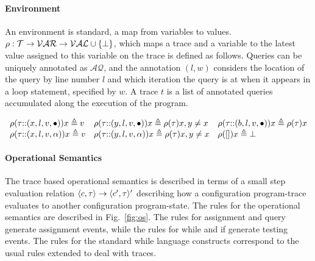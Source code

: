 \paragraph{Environment}
An environment is standard, a map from variables to values.
$\rho : {\mathcal{T}}  \to \mathcal{VAR} \to \mathcal{VAL} \cup \{\bot\}$, 
which maps a trace and a variable to the latest value assigned to this variable on the trace is defined as follows.
Queries can be uniquely annotated as $\mathcal{AQ}$, and the annotation $(l,w)$ considers the location of the query by line number $l$ and which 
iteration the query is at when it appears in a loop statement, specified by $w$. A trace $t$ is a list of annotated queries accumulated along the execution of the program. 

\[
\begin{array}{lll}
\rho(\mathtt{\tau}  {\small ::} (x, l, v, \bullet)) x \triangleq v
&
\rho(\mathtt{\tau} {\small ::} (y, l, v, \bullet)) x \triangleq \rho(\mathtt{\tau}) x, y \neq x
&
\rho(\mathtt{\tau} {\small ::} (b, l, v, \bullet)) x \triangleq \rho(\mathtt{\tau}) x
\\
\rho(\mathtt{\tau} {\small ::} (x, l, v, \alpha)) x \triangleq v
&
\rho(\mathtt{\tau} {\small ::} (y, l, v, \alpha)) x \triangleq \rho(\mathtt{\tau}) x, y \neq x
&
\rho({[]} ) x \triangleq \bot
\end{array}
\]

 \paragraph*{Operational Semantics}
 The trace based operational semantics is described in terms of a small step evaluation relation
 $\langle c, \mathtt{\tau} \rangle \to \langle c', \mathtt{\tau} \rangle'$  describing how a configuration program-trace evaluates to another
 configuration program-state. 
 The rules for the operational semantics are described in Fig.~\ref{fig:os}.
 The rules for assignment and query generate assignment events, while the rules for while and if generate testing events. 
 The rules for the standard while language constructs correspond to the usual rules extended to deal with traces. 

